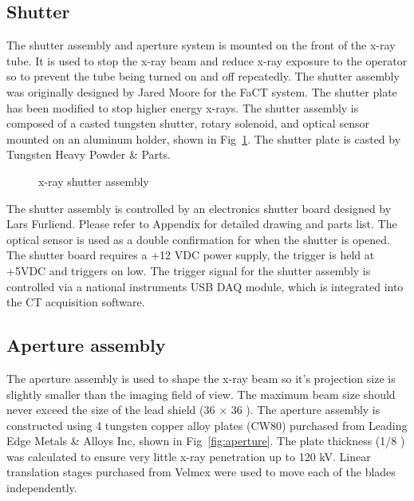 \subsection{Shutter}
The shutter assembly and aperture system is mounted on the front of the x-ray tube.  It is used to stop the x-ray beam and reduce x-ray exposure to the operator so to prevent the tube being turned on and off repeatedly.  The shutter assembly was originally designed by Jared Moore for the FaCT system.  The shutter plate has been modified to stop higher energy x-rays.  The shutter assembly is composed of a casted tungsten shutter, rotary solenoid, and optical sensor mounted on an aluminum holder, shown in Fig~\ref{fig:shutter}.  The shutter plate is casted by Tungsten Heavy Powder \& Parts.

\begin{figure}
\centering
	\begin{subfigure}{0.3\linewidth}
	\end{subfigure}
\hspace{0.2cm}
	\begin{subfigure}{0.3\linewidth}
	\end{subfigure}
\hspace{0.2cm}
	\begin{subfigure}{0.3\linewidth}
	\end{subfigure}	
\caption{x-ray shutter assembly}
\label{fig:shutter}
\end{figure}

The shutter assembly is controlled by an electronics shutter board designed by Lars Furliend.  Please refer to Appendix for detailed drawing and parts list.  The optical sensor is used as a double confirmation for when the shutter is opened.  The shutter board requires a +12 VDC power supply, the trigger is held at +5VDC and triggers on low.  The trigger signal for the shutter assembly is controlled via a national instruments USB DAQ module, which is integrated into the CT acquisition software.
		
\subsection{Aperture assembly}
The aperture assembly is used to shape the x-ray beam so it's projection size is slightly smaller than the imaging field of view.  The maximum beam size should never exceed the size of the lead shield (36 \inches $\times$ 36 \inches).  The aperture assembly is constructed using 4 tungsten copper alloy plates (CW80) purchased from Leading Edge Metals \& Alloys Inc, shown in Fig~\ref{fig:aperture}.  The plate thickness (1/8 \inches) was calculated to ensure very little x-ray penetration up to 120 kV.  Linear translation stages purchased from Velmex were used to move each of the blades independently.

